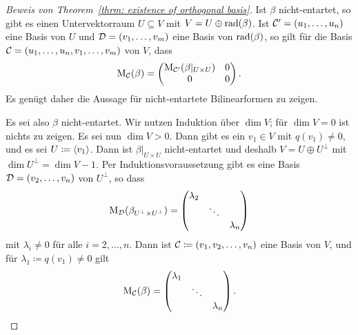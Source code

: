 \begin{proof}[Beweis von Theorem~\ref{thrm: existence of orthogonal basis}]
  Ist $\beta$ nicht-entartet, so gibt es einen Untervektorraum $U \subseteq V$ mit $V = U \oplus \operatorname{rad}(\beta)$.
  Ist $\mathcal{C}' = (u_1, \dotsc, u_n)$ eine Basis von $U$ und $\mathcal{D} = (v_1, \dotsc, v_m)$ eine Basis von $\operatorname{rad}(\beta)$, so gilt für die Basis $\mathcal{C} = (u_1, \dotsc, u_n, v_1, \dotsc, v_m)$ von $V$, dass
  \[
    \mathrm{M}_{\mathcal{C}}(\beta)
    =
    \begin{pmatrix}
      \mathrm{M}_{\mathcal{C}'}(\beta|_{U \times U})  & 0 \\
      0                                       & 0
    \end{pmatrix}.
  \]
  Es genügt daher die Aussage für nicht-entartete Bilinearformen zu zeigen.
  
  Es sei also $\beta$ nicht-entartet.
  Wir nutzen Induktion über $\dim V$; für $\dim V = 0$ ist nichts zu zeigen.
  Es sei nun $\dim V > 0$.
  Dann gibt es ein $v_1 \in V$ mit $q(v_1) \neq 0$, und es sei $U \coloneqq \left\langle v_1 \right\rangle$.
  Dann ist $\beta|_{U \times U}$ nicht-entartet und deshalb $V = U \oplus U^\perp$ mit $\dim U^\perp = \dim V - 1$.
  Per Induktionsvoraussetzung gibt es eine Basis $\mathcal{D} = (v_2, \dotsc, v_n)$ von $U^\perp$, so dass
  \[
    \mathrm{M}_{\mathcal{D}}(\beta_{U^\perp \times U^\perp})
    =
    \begin{pmatrix}
      \lambda_2 &         &           \\
                & \ddots  &           \\
                &         & \lambda_n
    \end{pmatrix}
  \]
  mit $\lambda_i \neq 0$ für alle $i = 2, \dotsc, n$.
  Dann ist $\mathcal{C} \coloneqq (v_1, v_2, \dotsc, v_n)$ eine Basis von $V$, und für $\lambda_1 \coloneqq q(v_1) \neq 0$ gilt
  \[
    \mathrm{M}_{\mathcal{C}}(\beta)
    =
    \begin{pmatrix}
      \lambda_1 &         &           \\
                & \ddots  &           \\
                &         & \lambda_n
    \end{pmatrix}.
  \]
\end{proof}


